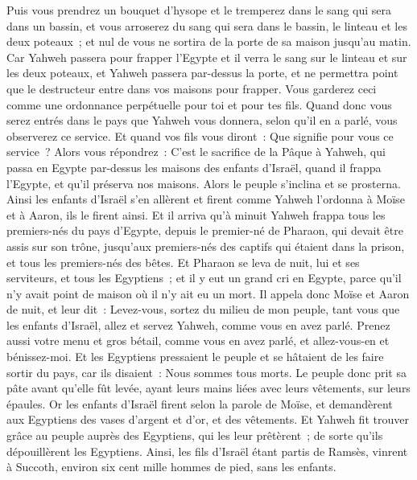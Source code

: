 \begin{multicols}{2}
Puis vous prendrez un bouquet d'hysope et le tremperez dans le sang qui sera dans un bassin, et vous arroserez du sang qui sera dans le bassin, le linteau et les deux poteaux~; et nul de vous ne sortira de la porte de sa maison jusqu'au matin.
Car Yahweh passera pour frapper l'Egypte et il verra le sang sur le linteau et sur les deux poteaux, et Yahweh passera par-dessus la porte, et ne permettra point que le destructeur entre dans vos maisons pour frapper.
Vous garderez ceci comme une ordonnance perpétuelle pour toi et pour tes fils.
Quand donc vous serez entrés dans le pays que Yahweh vous donnera, selon qu'il en a parlé, vous observerez ce service.
Et quand vos fils vous diront~: Que signifie pour vous ce service~?
Alors vous répondrez~: C'est le sacrifice de la Pâque à Yahweh, qui passa en Egypte par-dessus les maisons des enfants d'Israël, quand il frappa l'Egypte, et qu'il préserva nos maisons. Alors le peuple s'inclina et se prosterna.
Ainsi les enfants d'Israël s'en allèrent et firent comme Yahweh l'ordonna à Moïse et à Aaron, ils le firent ainsi.
Et il arriva qu'à minuit Yahweh frappa tous les premiers-nés du pays d'Egypte, depuis le premier-né de Pharaon, qui devait être assis sur son trône, jusqu'aux premiers-nés des captifs qui étaient dans la prison, et tous les premiers-nés des bêtes.
Et Pharaon se leva de nuit, lui et ses serviteurs, et tous les Egyptiens~; et il y eut un grand cri en Egypte, parce qu'il n'y avait point de maison où il n'y ait eu un mort.
Il appela donc Moïse et Aaron de nuit, et leur dit~: Levez-vous, sortez du milieu de mon peuple, tant vous que les enfants d'Israël, allez et servez Yahweh, comme vous en avez parlé.
Prenez aussi votre menu et gros bétail, comme vous en avez parlé, et allez-vous-en et bénissez-moi.
Et les Egyptiens pressaient le peuple et se hâtaient de les faire sortir du pays, car ils disaient~: Nous sommes tous morts.
Le peuple donc prit sa pâte avant qu'elle fût levée, ayant leurs mains liées avec leurs vêtements, sur leurs épaules.
Or les enfants d'Israël firent selon la parole de Moïse, et demandèrent aux Egyptiens des vases d'argent et d'or, et des vêtements.
Et Yahweh fit trouver grâce au peuple auprès des Egyptiens, qui les leur prêtèrent~; de sorte qu'ils dépouillèrent les Egyptiens.
Ainsi, les fils d'Israël étant partis de Ramsès, vinrent à Succoth, environ six cent mille hommes de pied, sans les enfants.

\end{multicols}
